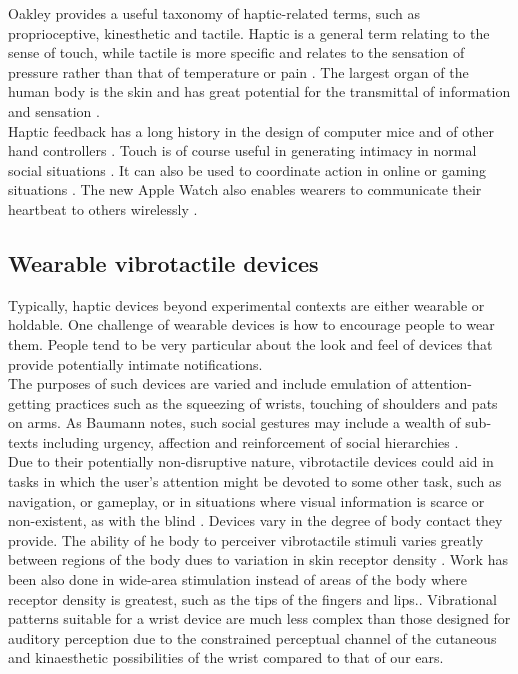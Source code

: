 \documentclass[a4paper, twocolumn]{article}
\begin{document}
Oakley provides a useful taxonomy of haptic-related terms, such as proprioceptive, kinesthetic and tactile. Haptic is a general term relating to the sense of touch, while tactile is more specific and relates to the sensation of pressure rather than that of temperature or pain \cite{oakley2000putting}. The largest organ of the human body is the skin and has great potential for the transmittal of information and sensation \cite{lindeman2006wearable} \cite{brewster2004tactons}.\\

Haptic feedback has a long history in the design of computer mice and of other hand controllers \cite{yang2005novel}. Touch is of course useful in generating intimacy in normal social situations \cite{bronner1982haptic}. It can also be used to coordinate action in online or gaming situations \cite{ho1998experiment}. The new Apple Watch also enables wearers to communicate their heartbeat to others wirelessly \cite{marks2014pulse}.\\

\subsection{Wearable vibrotactile devices}
Typically, haptic devices beyond experimental contexts are either wearable or holdable. One challenge of wearable devices is how to encourage people to wear them. People tend to be very particular about the look and feel of devices that provide potentially intimate notifications.\\ 

The purposes of such devices are varied and include emulation of attention-getting practices such as the squeezing of wrists, touching of shoulders and pats on arms. As Baumann notes, such social gestures may include a wealth of sub-texts including urgency, affection and reinforcement of social hierarchies \cite{baumann2010emulating}.\\

Due to their potentially non-disruptive nature, vibrotactile devices could aid in tasks in which the user's attention might be devoted to some other task, such as navigation, or gameplay, or in situations where visual information is scarce or non-existent, as with the blind \cite{ertan1998wearable}.  Devices vary in the degree of body contact they provide. The ability of he body to perceiver vibrotactile stimuli varies greatly between regions of the body dues to variation in skin receptor density \cite{lindeman2006wearable}. Work has been also done in wide-area stimulation instead of areas of the body where receptor density is greatest, such as the tips of the fingers and lips.\cite{lindeman2004towards}. Vibrational patterns suitable for a wrist device are much less complex than those designed for auditory perception due to the constrained perceptual channel of the cutaneous and kinaesthetic possibilities of the wrist compared to that of our ears.\\  
\end{document}
